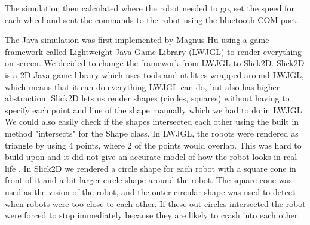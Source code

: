 The simulation then calculated where the robot needed to go, set the speed for each wheel and sent the commands to the robot using the bluetooth COM-port.

The Java simulation was first implemented by Magnus Hu using a game framework called Lightweight Java Game Library (LWJGL) to render everything on screen. We decided to change the framework from LWJGL to Slick2D. Slick2D is a 2D Java game library which uses tools and utilities wrapped around LWJGL, which means that it can do everything LWJGL can do, but also has higher abstraction. Slick2D lets us render shapes (circles, squares) without having to specify each point and line of the shape manually which we had to do in LWJGL. We could also easily check if the shapes intersected each other using the built in method "intersects" for the Shape class. In LWJGL, the robots were rendered as triangle by using 4 points, where 2 of the points would overlap. This was hard to build upon and it did not give an accurate model of how the robot looks in real life .
In Slick2D we rendered a circle shape for each robot with a square cone in front of it and a bit larger circle shape around the robot. The square cone was used as the vision of the robot, and the outer circular shape was used to detect when robots were too close to each other. If these out circles intersected the robot were forced to stop immediately because they are likely to crash into each other.

